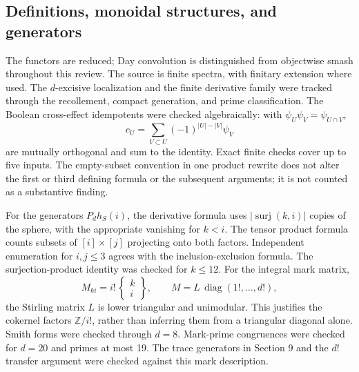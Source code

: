 \documentclass[10pt]{article}
\begin{document}
\subsection*{Definitions, monoidal structures, and generators}
The functors are reduced; Day convolution is distinguished from objectwise smash throughout this review. The source is finite spectra, with finitary extension where used. The \(d\)-excisive localization and the finite derivative family were tracked through the recollement, compact generation, and prime classification. The Boolean cross-effect idempotents were checked algebraically: with \(\psi_U\psi_V=\psi_{U\cap V}\), \[c_U=\sum_{V\subset U}(-1)^{|U|-|V|}\psi_V\] are mutually orthogonal and sum to the identity. Exact finite checks cover up to five inputs. The empty-subset convention in one product rewrite does not alter the first or third defining formula or the subsequent arguments; it is not counted as a substantive finding.\par
For the generators \(P_dh_S(i)\), the derivative formula uses \(|\operatorname{surj}(k,i)|\) copies of the sphere, with the appropriate vanishing for \(k<i\). The tensor product formula counts subsets of \([i]\times[j]\) projecting onto both factors. Independent enumeration for \(i,j\le3\) agrees with the inclusion-exclusion formula. The surjection-product identity was checked for \(k\le12\). For the integral mark matrix, \[M_{ki}=i!\,\left\{\begin{matrix}k\\i\end{matrix}\right\},
 \qquad M=L\,\operatorname{diag}(1!,\ldots,d!),\] the Stirling matrix \(L\) is lower triangular and unimodular. This justifies the cokernel factors \(\mathbb Z/i!\), rather than inferring them from a triangular diagonal alone. Smith forms were checked through \(d=8\). Mark-prime congruences were checked for \(d=20\) and primes at most 19. The trace generators in Section 9 and the \(d!\) transfer argument were checked against this mark description.\par
\end{document}
